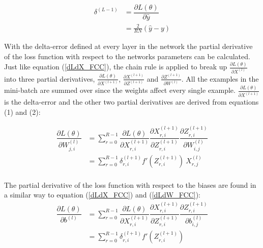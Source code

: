 \documentclass[a4paper,11pt,twoside]{article}
\newcommand*{\pd}[2]{\ensuremath{\dfrac{\partial #1}{\partial #2}}}
\newcommand*{\inpd}[2]{\ensuremath{\frac{\partial #1}{\partial #2}}}
\begin{document}
\begin{equation}\label{MSEdelta}
\begin{split}
\delta^{(L-1)}
	& = \pd{L(\theta)}{\hat{y}}  \\
	& = \frac{2}{RN} (\hat{y}-y)
\end{split}
\end{equation}

With the delta-error defined at every layer in the network the partial derivative of the loss function with respect to the networks parameters can be calculated. Just like equation (\ref{dLdX_FCC}), the chain rule is applied to break up $\inpd{L(\theta)}{X^{(l)}}$ into three partial derivatives, $\inpd{L(\theta)}{X^{(l+1)}}$, $\inpd{X^{(l+1)}}{Z^{(l+1)}}$ and $\inpd{Z^{(l+1)}}{W^{(l)}}$. All the examples in the mini-batch are summed over since the weights affect every single example. $\inpd{L(\theta)}{X^{(l+1)}}$ is the delta-error and the other two partial derivatives are derived from equations (1) and (2): \cite{cs231n} \cite{wikiStanford}

\begin{equation}\label{dLdW_FCC}
\begin{split}
\pd{L(\theta)}{W^{(l)}_{j,i}} 
	& = \sum^{R-1}_{r=0} \pd{L(\theta)}{X^{(l+1)}_{r,i}} \pd{X^{(l+1)}_{r,i}}{Z^{(l+1)}_{r,i}} \pd{Z^{(l+1)}_{r,i}}{W^{(l)}_{i,j}} \\
	& = \sum^{R-1}_{r=0} \delta^{(l+1)}_{r,i} f'(Z^{(l+1)}_{r,i}) \ X^{(l)}_{r,j}\\
\end{split}
\end{equation}

The partial derivative of the loss function with respect to the biases are found in a similar way to equation (\ref{dLdX_FCC}) and (\ref{dLdW_FCC}): \cite{cs231n} \cite{wikiStanford}
\begin{equation}\label{dLdb_FCC}
\begin{split}
\pd{L(\theta)}{b^{(l)}} 
	& = \sum^{R-1}_{r=0} \pd{L(\theta)}{X^{(l+1)}_{r,i}} \pd{X^{(l+1)}_{r,i}}{Z^{(l+1)}_{r,i}} \pd{Z^{(l+1)}_{r,i}}{b^{(l)}_{i,j}} \\
	& = \sum^{R-1}_{r=0} \delta^{(l+1)}_{r,i} f'(Z^{(l+1)}_{r,i}) \\
\end{split}
\end{equation}
\end{document}
